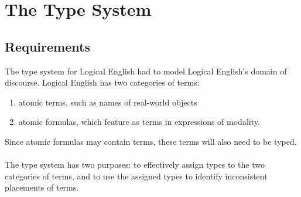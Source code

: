 \documentclass[../main.tex]{subfiles}
\begin{document}
\chapter{The Type System}
\section{Requirements}
The type system for Logical English had to model Logical English's domain of discourse. Logical English has two categories of terms:
\begin{enumerate}
    \item atomic terms, such as names of real-world objects
    \item atomic formulas, which feature as terms in expressions of modality.
\end{enumerate}
Since atomic formulas may contain terms, these terms will also need to be typed.
\\
\\
The type system has two purposes: to effectively assign types to the two categories of terms, and to use the assigned types to identify inconsistent placements of terms. 


\end{document}
